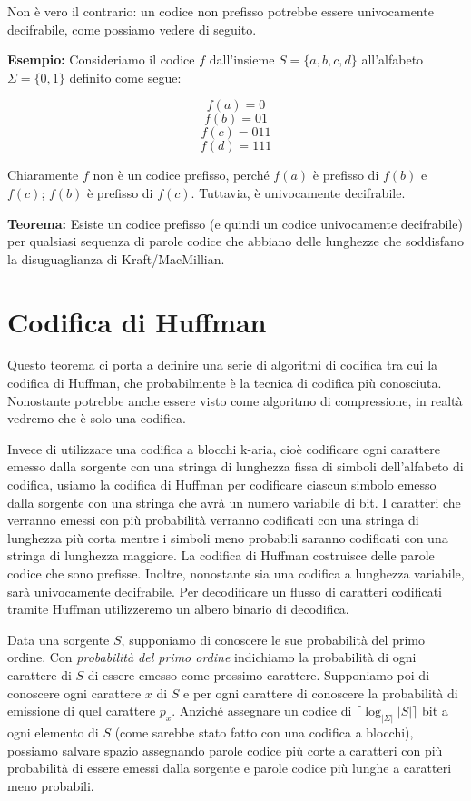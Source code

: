 Non è vero il contrario: un codice non prefisso potrebbe essere univocamente decifrabile, come possiamo vedere di seguito.

\vspace{5mm}

\textbf{Esempio:} Consideriamo il codice \(f\) dall'insieme \(S = \{a,b,c,d\}\) all'alfabeto \(\Sigma = \{0,1\}\) definito come segue:

\[f(a) = 0\]
\[f(b) = 01\]
\[f(c) = 011\]
\[f(d) = 111\]

Chiaramente \(f\) non è un codice prefisso, perché \(f(a)\) è prefisso di \(f(b)\) e \(f(c)\); \(f(b)\) è prefisso di \(f(c)\). Tuttavia, è univocamente decifrabile.

\vspace{5mm}

\textbf{Teorema:} Esiste un codice prefisso (e quindi un codice univocamente decifrabile) per qualsiasi sequenza di parole codice che abbiano delle lunghezze che soddisfano la disuguaglianza di Kraft/MacMillian.

\section{Codifica di Huffman}
Questo teorema ci porta a definire una serie di algoritmi di codifica tra cui la codifica di Huffman, che probabilmente è la tecnica di codifica più conosciuta. Nonostante potrebbe anche essere visto come algoritmo di compressione, in realtà vedremo che è solo una codifica.

Invece di utilizzare una codifica a blocchi k-aria, cioè codificare ogni carattere emesso dalla sorgente con una stringa di lunghezza fissa di simboli dell'alfabeto di codifica, usiamo la codifica di Huffman per codificare ciascun simbolo emesso dalla sorgente con una stringa che avrà un numero variabile di bit. I caratteri che verranno emessi con più probabilità verranno codificati con una stringa di lunghezza più corta mentre i simboli meno probabili saranno codificati con una stringa di lunghezza maggiore. La codifica di Huffman costruisce delle parole codice che sono prefisse. Inoltre, nonostante sia una codifica a lunghezza variabile, sarà univocamente decifrabile. Per decodificare un flusso di caratteri codificati tramite Huffman utilizzeremo un albero binario di decodifica. 

\vspace{5mm}

Data una sorgente \(S\), supponiamo di conoscere le sue probabilità del primo ordine. Con \textit{probabilità del primo ordine} indichiamo la probabilità di ogni carattere di \(S\) di essere emesso come prossimo carattere. Supponiamo poi di conoscere ogni carattere \(x\) di \(S\) e per ogni carattere di conoscere la probabilità di emissione di quel carattere \(p_x\). Anziché assegnare un codice di \(\lceil \log_{|\Sigma|}|S| \rceil\) bit a ogni elemento di \(S\) (come sarebbe stato fatto con una codifica a blocchi), possiamo salvare spazio assegnando parole codice più corte a caratteri con più probabilità di essere emessi dalla sorgente e parole codice più lunghe a caratteri meno probabili. 

